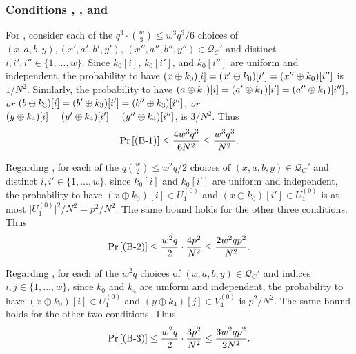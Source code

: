 %
%
%
\subsubsection{Conditions \bone, \btwo, and \bthree}

For \bone, consider each of the $q^3\cdot{w\choose 3}\leq w^3q^3/6$ choices of $(x,a,b,y),(x',a',b',y')$, $(x'',a'',b'',y'')\in \mathcal{Q}_{C}'$ and distinct $i, i', i'' \in \{1, \ldots, w\}$. Since $k_0[i]$, $k_0[i']$, and $k_0[i'']$ are uniform and independent, the probability to have $(x\oplus k_0)[i]=(x'\oplus k_0)[i']=(x''\oplus k_0)[i'']$ is $1/N^2$. Similarly, the probability to have $(a\oplus k_1)[i]=(a'\oplus k_1)[i']=(a''\oplus k_1)[i'']$, {\it or} $(b\oplus k_3)[i]=(b'\oplus k_3)[i']=(b''\oplus k_3)[i'']$, {\it or} $(y\oplus k_4)[i]=(y'\oplus k_4)[i']=(y''\oplus k_4)[i'']$, is $3/N^2$. Thus
%
$$
\operatorname{Pr}\left[\text{(B-1)}\right] \leq \frac{4w^3q^3}{6N^2}\leq \frac{w^3q^3}{N^2}.
$$
%


		

%

Regarding \btwo, for each of the $q{w\choose 2}\leq w^2q/2$ choices of $(x,a,b, y) \in \mathcal{Q}_{C}'$ and distinct $i, i' \in \{1, \ldots, w\}$, since $k_0[i]$ and $k_0[i']$ are uniform and independent, the probability to have $(x \oplus k_{0})[i]\in U_1^{(0)}$ and $(x \oplus k_0)[i']\in U_1^{(0)}$ is at most $\big|U_1^{(0)}\big|^2/N^2=p^2/N^2$. The same bound holds for the other three conditions. Thus
%
$$
\operatorname{Pr}\left[\text{(B-2)}\right] \leq \frac{w^{2} q}{2}\cdot\frac{4p^2}{N^2}\leq\frac{2w^{2} q p^2}{N^{2}}.
$$
%




%

Regarding \bthree, for each of the $w^2q$ choices of $(x,a,b,y)\in\mathcal{Q}_{C}'$ and indices $i, j \in \{1, \ldots, w\}$, since $k_{0}$ and $k_{4}$ are uniform and independent, the probability to have $(x \oplus k_{0})[i]\in U_1^{(0)}$ and $(y \oplus k_{4})[j]\in V_4^{(0)}$ is $p^2/N^2$. The same bound holds for the other two conditions. Thus
%
$$
\operatorname{Pr}\left[\text{(B-3)}\right] \leq \frac{w^{2} q}{2}\cdot\frac{3p^2}{N^2}\leq\frac{3w^{2} q p^2}{2N^{2}}.
$$
%




